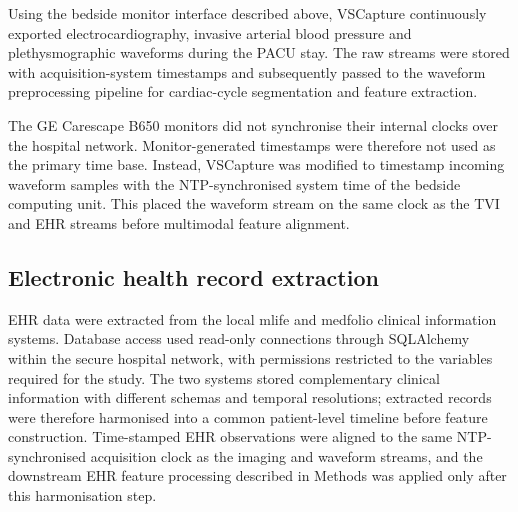 \documentclass[11pt]{article}
\begin{document}
Using the bedside monitor interface described above, VSCapture continuously exported electrocardiography, invasive arterial blood pressure and plethysmographic waveforms during the PACU stay. The raw streams were stored with acquisition-system timestamps and subsequently passed to the waveform preprocessing pipeline for cardiac-cycle segmentation and feature extraction.

The GE Carescape B650 monitors did not synchronise their internal clocks over the hospital network. Monitor-generated timestamps were therefore not used as the primary time base. Instead, VSCapture was modified to timestamp incoming waveform samples with the NTP-synchronised system time of the bedside computing unit. This placed the waveform stream on the same clock as the TVI and EHR streams before multimodal feature alignment.

\subsection*{Electronic health record extraction}

EHR data were extracted from the local mlife and medfolio clinical information systems. Database access used read-only connections through SQLAlchemy within the secure hospital network, with permissions restricted to the variables required for the study. The two systems stored complementary clinical information with different schemas and temporal resolutions; extracted records were therefore harmonised into a common patient-level timeline before feature construction. Time-stamped EHR observations were aligned to the same NTP-synchronised acquisition clock as the imaging and waveform streams, and the downstream EHR feature processing described in Methods was applied only after this harmonisation step.
\end{document}
